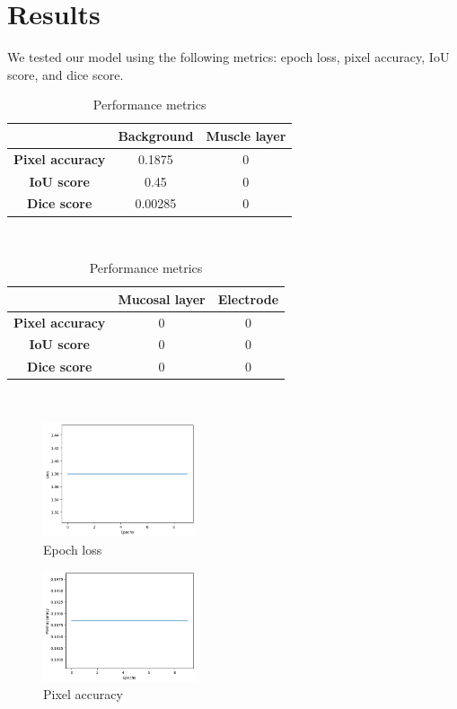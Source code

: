 \section{Results}
\label{sec:results}

We tested our model using the following metrics: epoch loss, pixel accuracy, IoU score, and dice score.

\begin{table}[htbp]
    \centering
    \caption{Performance metrics}
    \label{tab:example}
    \begin{tabular}{|c|c|c|}
        \hline
        \textbf{} & \textbf{Background} & \textbf{Muscle layer} \\
        \hline
        \textbf{Pixel accuracy} & 0.1875 & 0 \\
        \textbf{IoU score} & 0.45 & 0 \\
        \textbf{Dice score} & 0.00285 & 0 \\
        \hline
    \end{tabular} \\
    \begin{tabular}{|c|c|c|}
        \hline
        \textbf{} & \textbf{Mucosal layer} & \textbf{Electrode} \\
        \hline
        \textbf{Pixel accuracy} & 0 & 0 \\
        \textbf{IoU score} & 0 & 0 \\
        \textbf{Dice score} & 0 & 0 \\
        \hline
    \end{tabular} \\
\end{table}

\begin{figure}[!]
    \centering
    \includegraphics[width=0.4\textwidth]{Plots/loss}
    \caption{Epoch loss}
    \label{fig:loss}
\end{figure}

\begin{figure}[htp!]
    \centering
    \includegraphics[width=0.4\textwidth]{Plots/accuracy}
    \caption{Pixel accuracy}
    \label{fig:accuracy}
\end{figure}


